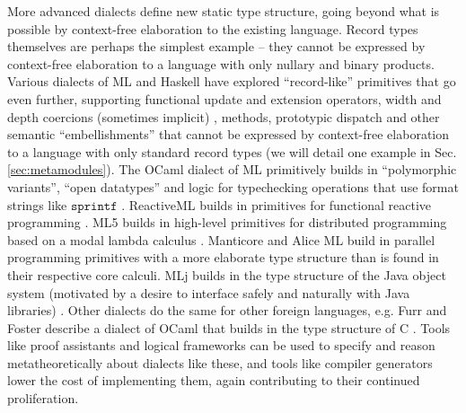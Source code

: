 More advanced dialects define new static type structure, going beyond what is possible by context-free elaboration to the existing language. Record types themselves are perhaps  the simplest example -- they cannot be expressed by context-free elaboration to a language with only nullary and binary products. Various dialects of ML and Haskell have explored  ``record-like'' primitives that go even further, supporting functional update and extension operators, width and depth coercions (sometimes implicit)%
, methods, prototypic dispatch and other semantic ``embellishments'' that cannot be expressed by context-free elaboration to a language with only standard record types (we will detail one  example in Sec. \ref{sec:metamodules}). The OCaml dialect of ML primitively builds in ``polymorphic variants'', ``open datatypes'' and  logic for typechecking operations that use format strings like $\mathtt{sprintf}$ \cite{ocaml-manual}. ReactiveML builds in primitives for functional reactive programming \cite{mandel2005reactiveml}. ML5 builds in high-level primitives for distributed programming based on a modal lambda calculus \cite{Murphy:2007:TDP:1793574.1793585}. Manticore \cite{conf/popl/FluetRRSX07} and Alice ML  \cite{AliceLookingGlass} build in parallel programming primitives with a more elaborate type structure than is found in their respective core calculi. 
MLj builds in the type structure of the Java object system (motivated by a desire to interface safely and naturally with Java libraries) \cite{Benton:1999:IWW:317636.317791}. Other dialects do the same for other foreign languages, e.g. Furr and Foster describe a dialect of OCaml that builds in the type structure of C \cite{Furr:2005:CTS:1065010.1065019}. Tools like proof assistants and logical frameworks can be used to specify and reason metatheoretically about dialects like these, and tools like compiler generators lower the cost of implementing them, again contributing to their continued proliferation. 


